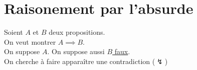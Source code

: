 \part{Raisonement par l'absurde}


Soient $A$ et $B$ deux propositions.\\
On veut montrer $A \implies B$.\\
On suppose \underline{$A$}. On suppose aussi \underline{$B$ faux}.\\
On cherche à faire apparaître une contradiction ($\lightning$)
